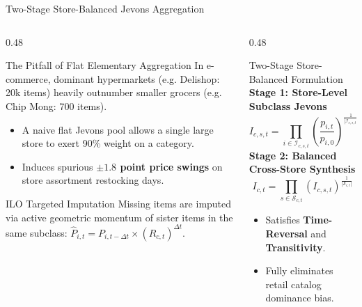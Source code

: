 \documentclass[aspectratio=169, 10pt]{beamer}
\begin{document}
\begin{frame}[shrink=10]{Two-Stage Store-Balanced Jevons Aggregation}
  \begin{columns}
    \begin{column}{0.48\textwidth}
      \begin{alertblock}{The Pitfall of Flat Elementary Aggregation}
        In e-commerce, dominant hypermarkets (e.g. Delishop: 20k items) heavily outnumber smaller grocers (e.g. Chip Mong: 700 items).
        \begin{itemize}
          \item A naive flat Jevons pool allows a single large store to exert 90\% weight on a category.
          \item Induces spurious \textbf{$\pm 1.8$ point price swings} on store assortment restocking days.
        \end{itemize}
      \end{alertblock}

      \begin{block}{ILO Targeted Imputation}
        Missing items are imputed via active geometric momentum of sister items in the same subclass: $\widehat{P}_{i, t} = P_{i, t-\Delta t} \times \left( R_{c, t} \right)^{\Delta t}$.
      \end{block}
    \end{column}

    \begin{column}{0.48\textwidth}
      \begin{exampleblock}{Two-Stage Store-Balanced Formulation}
        \textbf{Stage 1: Store-Level Subclass Jevons}
        \begin{equation*}
          I_{c, s, t} = \prod_{i \in \mathcal{I}_{c, s, t}} \left( \frac{p_{i, t}}{p_{i, 0}} \right)^{\frac{1}{|\mathcal{I}_{c, s, t}|}}
        \end{equation*}
        \textbf{Stage 2: Balanced Cross-Store Synthesis}
        \begin{equation*}
          I_{c, t} = \prod_{s \in \mathcal{S}_{c, t}} \left( I_{c, s, t} \right)^{\frac{1}{|\mathcal{S}_{c, t}|}}
        \end{equation*}
        \begin{itemize}
          \item Satisfies \textbf{Time-Reversal} and \textbf{Transitivity}.
          \item Fully eliminates retail catalog dominance bias.
        \end{itemize}
      \end{exampleblock}
    \end{column}
  \end{columns}
\end{frame}
\end{document}
